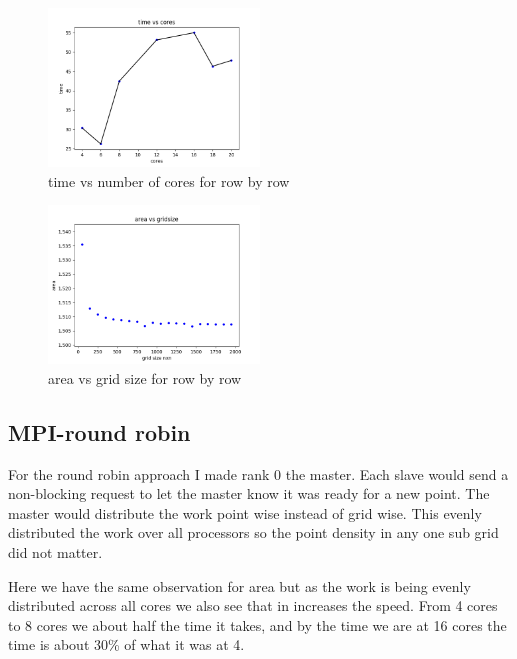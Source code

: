 \documentclass[12pt]{article}
\theoremstyle{plain}
\theoremstyle{definition}
\begin{document}
\begin{figure}
 \centering
        \includegraphics[width=0.5\textwidth]{time_b.png}
        \caption{time vs number of cores for row by row}
\end{figure}
\begin{figure}
 \centering
        \includegraphics[width=0.5\textwidth]{area_b.png}
        \caption{area vs grid size for row by row}
\end{figure}



\subsection*{MPI-round robin} 

For the round robin approach I made rank 0 the master. Each slave would send a non-blocking request to let the master know it was ready for a new point. The master would distribute the work point wise instead of grid wise. This evenly distributed the work over all processors so the point density in any one sub grid did not matter.

Here we have the same observation for area but as the work is being evenly distributed across all cores we also see that in increases the speed. From 4 cores to 8 cores we about half the time it takes, and by the time we are at 16 cores the time is about 30\% of what it was at 4.
\end{document}

